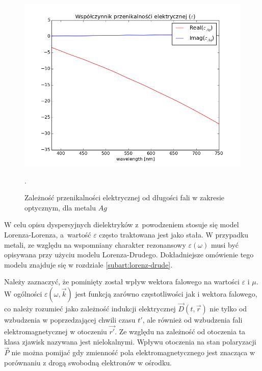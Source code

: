 \begin{figure}[tb]
	\includegraphics[width=\textwidth]{images/agtio2eps.png}
	\caption{Zależność przenikalności elektrycznej od długości fali w zakresie optycznym, dla metalu $Ag$ \cite{PhysRevB.6.4370} }.  
	\label{fig:agtio2eps}
\end{figure}
W celu opisu dyspersyjnych dielektryków z~powodzeniem stosuje się model Lorenza-Lorenza, a~wartość $\varepsilon$ często traktowana jest jako stała. W przypadku metali, ze względu na wspomniany charakter rezonansowy $\varepsilon(\omega)$  musi być opisywana przy użyciu modelu Lorenza-Drudego. Dokładniejsze omówienie tego modelu znajduje się w rozdziale \ref{subart:lorenz-drude}.

Należy zaznaczyć, że pominięty został wpływ wektora falowego na wartości $\varepsilon$ i $\mu$. W ogólności $\varepsilon(\omega,\vec{k})$ jest funkcją zarówno częstotliwości jak i wektora falowego, co należy rozumieć jako zależność indukcji elektrycznej $\vec{D}(t,\vec{r})$ nie tylko od wzbudzenia w poprzedzającej chwili czasu $t'$, ale również od wzbudzenia fali elektromagnetycznej w otoczeniu $\vec{r'}$. Ze względu na zależność od otoczenia ta klasa zjawisk nazywana jest nielokalnymi. Wpływu otoczenia na stan polaryzacji $\vec{P}$ nie można pomijać gdy zmienność pola elektromagnetycznego jest znacząca w porównaniu z drogą swobodną elektronów w ośrodku.



